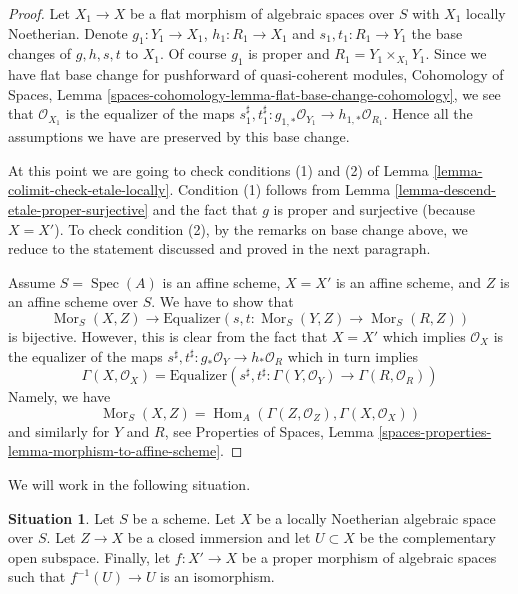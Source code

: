 \documentclass{stacks-project}
\theoremstyle{plain}
\theoremstyle{definition}
\newtheorem{situation}[subsection]{Situation}
\theoremstyle{remark}
\numberwithin{equation}{subsection}
\def\Spec{\mathop{\mathrm{Spec}}}
\def\Hom{\mathop{\mathrm{Hom}}\nolimits}
\def\Mor{\mathop{\mathrm{Mor}}\nolimits}
\begin{document}
\begin{proof}
\medskip\noindent
Let $X_1 \to X$ be a flat morphism of algebraic spaces over $S$ with $X_1$
locally Noetherian. Denote $g_1 : Y_1 \to X_1$, $h_1 : R_1 \to X_1$ and
$s_1, t_1 : R_1 \to Y_1$ the base changes of $g, h, s, t$ to $X_1$.
Of course $g_1$ is proper and $R_1 = Y_1 \times_{X_1} Y_1$.
Since we have flat base change for pushforward of quasi-coherent modules,
Cohomology of Spaces, Lemma
\ref{spaces-cohomology-lemma-flat-base-change-cohomology}, we see that
$\mathcal{O}_{X_1}$ is the equalizer of the maps
$s_1^\sharp, t_1^\sharp : g_{1, *}\mathcal{O}_{Y_1} \to
h_{1, *}\mathcal{O}_{R_1}$. Hence all the assumptions we have
are preserved by this base change.

\medskip\noindent
At this point we are going to check conditions (1) and (2) of
Lemma \ref{lemma-colimit-check-etale-locally}. Condition (1)
follows from Lemma \ref{lemma-descend-etale-proper-surjective}
and the fact that $g$ is proper and surjective (because $X = X'$).
To check condition (2), by the remarks on base change above,
we reduce to the statement discussed and proved in the next paragraph.

\medskip\noindent
Assume $S = \Spec(A)$ is an affine scheme, $X = X'$ is an affine scheme, and
$Z$ is an affine scheme over $S$. We have to show that
$$
\Mor_S(X, Z) \longrightarrow
\text{Equalizer}(s, t : \Mor_S(Y, Z) \to \Mor_S(R, Z))
$$
is bijective. However, this is clear from the fact that $X = X'$
which implies $\mathcal{O}_X$ is the equalizer of the maps
$s^\sharp, t^\sharp : g_*\mathcal{O}_Y \to h_*\mathcal{O}_R$
which in turn implies
$$
\Gamma(X, \mathcal{O}_X) =
\text{Equalizer}\left(
s^\sharp, t^\sharp : \Gamma(Y, \mathcal{O}_Y) \to
\Gamma(R, \mathcal{O}_R)
\right)
$$
Namely, we have
$$
\Mor_S(X, Z) = \Hom_A(\Gamma(Z, \mathcal{O}_Z), \Gamma(X, \mathcal{O}_X))
$$
and similarly for $Y$ and $R$, see Properties of Spaces, Lemma
\ref{spaces-properties-lemma-morphism-to-affine-scheme}.
\end{proof}

\noindent
We will work in the following situation.

\begin{situation}
\label{situation-coequalizer-glue}
Let $S$ be a scheme. Let $X$ be a locally Noetherian algebraic space over $S$.
Let $Z \to X$ be a closed immersion and let $U \subset X$ be the complementary
open subspace. Finally, let $f : X' \to X$ be a proper morphism of algebraic
spaces such that $f^{-1}(U) \to U$ is an isomorphism.
\end{situation}
\end{document}
